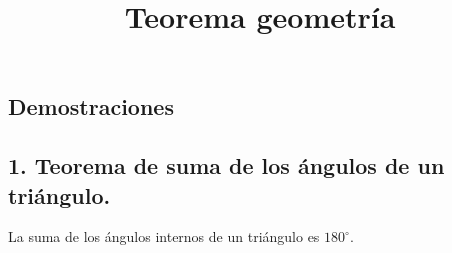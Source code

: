 \documentclass[12pt,a4paper]{article}
\title{Teorema geometría}
\begin{document}
\sffamily
\begin{figure}
\end{figure}
\cfoot{}
\begin{center}
\section*{Demostraciones}
\end{center}
\subsection*{1. Teorema de suma de los ángulos de un triángulo.} 
La suma de los ángulos internos de un triángulo es $180^\circ$.
\end{document}
